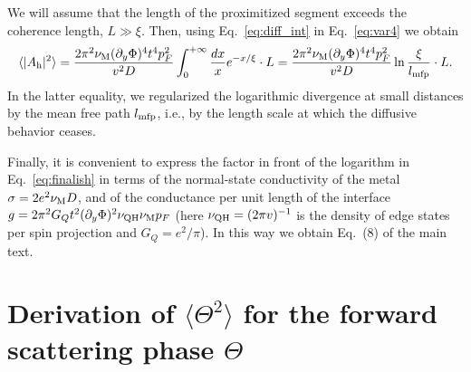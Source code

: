 \documentclass[pra,aps,a4paper,twocolumn,superscriptaddress,longbibliography]{revtex4-2}
\newcommand{\lprox}{L}
\newcommand{\he}{A_{\rm h}}
\newcommand{\xic}{\xi}
\begin{document}
We will assume that the length of the proximitized segment exceeds the coherence length, $\lprox \gg \xic$. Then, using Eq.~\eqref{eq:diff_int} in Eq.~\eqref{eq:var4} we obtain
\begin{equation}\label{eq:finalish}
   \langle |\he|^2 \rangle = \frac{2\pi^2 \nu_{\rm M}(\partial_y \Phi)^4 t^4 p_F^2}{v^2 D}
   \int_0^{+\infty} \frac{dx}{x} e^{-x/\xic} \cdot \lprox = \frac{2\pi^2 \nu_{\rm M}(\partial_y \Phi)^4 t^4 p_F^2}{v^2 D}\ln{\frac{\xic}{l_{\rm mfp}}}\cdot \lprox. 
\end{equation}
In the latter equality, we regularized the logarithmic divergence at small distances by the mean free path $l_{\rm mfp}$, i.e., by the length scale at which the diffusive behavior ceases. 

Finally, it is convenient to express the factor in front of the logarithm in Eq.~\eqref{eq:finalish} in terms of the normal-state conductivity of the metal $\sigma = 2e^2\nu_{\rm M}D$, and of the conductance per unit length of the interface $g = 2\pi^2 G_Q t^2 (\partial_y \Phi)^2 \nu_{\rm QH} \nu_{\rm M} p_F$ (here $\nu_{\rm QH} = (2\pi v)^{-1}$ is the density of edge states per spin projection and $G_Q = e^2 / \pi$). In this way we obtain Eq.~(8) of the main text.

\section{Derivation of $\langle \Theta^2 \rangle$ for the forward scattering phase $\Theta$}
\end{document}
